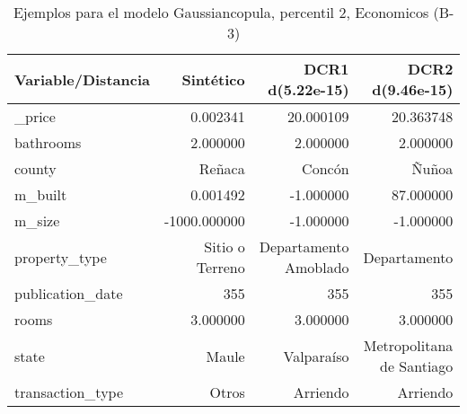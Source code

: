 \begin{table}[H]
\centering
\fontsize{10}{14}\selectfont
\caption{Ejemplos para el modelo Gaussiancopula, percentil 2, Economicos (B-3)}
\label{table-example-economicos-b-3-gaussiancopula-2p}
\begin{tabular}{|l|r|r|r|}
\hline
\rowcolor[gray]{0.8}
Variable/Distancia & Sintético & DCR1 d(5.22e-15) & DCR2 d(9.46e-15) \\
\hline \_price & \cellcolor[rgb]{0.9, 0.54, 0.52} 0.002341 & 20.000109 & 20.363748 \\
\hline bathrooms & \cellcolor[rgb]{0.9, 0.54, 0.52} 2.000000 & \cellcolor[rgb]{0.9, 0.54, 0.52} 2.000000 & \cellcolor[rgb]{0.9, 0.54, 0.52} 2.000000 \\
\hline county & \cellcolor[rgb]{0.9, 0.54, 0.52} Reñaca & Concón & Ñuñoa \\
\hline m\_built & \cellcolor[rgb]{0.9, 0.54, 0.52} 0.001492 & \cellcolor[rgb]{0.9, 0.54, 0.52} -1.000000 & 87.000000 \\
\hline m\_size & \cellcolor[rgb]{0.9, 0.54, 0.52} -1000.000000 & \cellcolor[rgb]{0.9, 0.54, 0.52} -1.000000 & \cellcolor[rgb]{0.9, 0.54, 0.52} -1.000000 \\
\hline property\_type & \cellcolor[rgb]{0.9, 0.54, 0.52} Sitio o Terreno & Departamento Amoblado & Departamento \\
\hline publication\_date & \cellcolor[rgb]{0.9, 0.54, 0.52} 355 & \cellcolor[rgb]{0.9, 0.54, 0.52} 355 & \cellcolor[rgb]{0.9, 0.54, 0.52} 355 \\
\hline rooms & \cellcolor[rgb]{0.9, 0.54, 0.52} 3.000000 & \cellcolor[rgb]{0.9, 0.54, 0.52} 3.000000 & \cellcolor[rgb]{0.9, 0.54, 0.52} 3.000000 \\
\hline state & \cellcolor[rgb]{0.9, 0.54, 0.52} Maule & Valparaíso & Metropolitana de Santiago \\
\hline transaction\_type & \cellcolor[rgb]{0.9, 0.54, 0.52} Otros & Arriendo & Arriendo \\
\hline
\end{tabular}
\end{table}
